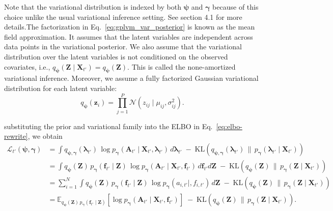 Note that the variational distribution is indexed by both 
\(\boldsymbol{\psi}\) and \(\boldsymbol{\gamma}\) because of this choice unlike the usual 
variational inference setting. See section 4.1 \cite{leibfriedTutorialSparseGaussian2022} for more details.The factorization in Eq.~\ref{eq:gplvm_var_posterior} is known as 
the mean field approximation. It assumes that the 
latent variables are independent across data points in the variational posterior. We also assume that 
the variational distribution over the latent variables is not conditioned on the observed covariates, i.e.,
\(q_{\boldsymbol{\psi}}(\mathbf{Z}\mid \mathbf{X}_{t'}) = q_{\boldsymbol{\psi}}(\mathbf{Z})\). This is called 
the none-amortized variational inference. Moreover, we assume 
a fully factorized Gaussian variational distribution for each latent variable:
\begin{equation}
    q_{\boldsymbol{\psi}}(\mathbf{z}_i) = \prod_{j=1}^P \mathcal{N}(z_{ij} \mid \mu_{ij}, \sigma_{ij}^2).
\end{equation}

substituting the prior and variational family into the ELBO in Eq.~\ref{eq:elbo-rewrite}, we obtain
\begin{align}
\mathcal{L}_{t'}(\boldsymbol{\psi},\boldsymbol{\gamma})
&= \int q_{\boldsymbol{\psi},\boldsymbol{\gamma}}(\boldsymbol{\lambda}_{t'})\,\log p_{\boldsymbol{\gamma}}(\mathbf{A}_{t'}\mid \mathbf{X}_{t'},\boldsymbol{\lambda}_{t'})\, d\boldsymbol{\lambda}_{t'}
    \;-\; \mathrm{KL}\!\left(q_{\boldsymbol{\psi},\boldsymbol{\gamma}}(\boldsymbol{\lambda}_{t'})\,\|\,p_{\boldsymbol{\gamma}}(\boldsymbol{\lambda}_{t'}\mid \mathbf{X}_{t'})\right) \\
&= \int q_{\boldsymbol{\psi}}(\mathbf{Z})\,p_{\boldsymbol{\gamma}}(\mathbf{f}_{t'} \mid \mathbf{Z})\,\log p_{\boldsymbol{\gamma}}(\mathbf{A}_{t'}\mid \mathbf{X}_{t'},\mathbf{f}_{t'})\, d\mathbf{f}_{t'} d\mathbf{Z}
    \;-\; \mathrm{KL}\!\left(q_{\boldsymbol{\psi}}(\mathbf{Z})\,\|\,p_{\boldsymbol{\gamma}}(\mathbf{Z}\mid \mathbf{X}_{t'})\right) \\
&= \sum_{i=1}^N \int q_{\boldsymbol{\psi}}(\mathbf{Z})\,p_{\boldsymbol{\gamma}}(\mathbf{f}_{t'} \mid \mathbf{Z})\,\log p_{\boldsymbol{\gamma}}(a_{i,t'}\mid,f_{i,t'})\,d\mathbf{Z}
    \;-\; \mathrm{KL}\!\left(q_{\boldsymbol{\psi}}(\mathbf{Z})\,\|\,p_{\boldsymbol{\gamma}}(\mathbf{Z}\mid \mathbf{X}_{t'})\right) \\
&= \mathbb{E}_{q_{\boldsymbol{\psi}}(\mathbf{Z})\,p_{\boldsymbol{\gamma}}(\mathbf{f}_{t'} \mid \mathbf{Z})}
\left[\log p_{\boldsymbol{\gamma}}(\mathbf{A}_{t'}\mid \mathbf{X}_{t'},\mathbf{f}_{t'})\right]
    \;-\; \mathrm{KL}\!\left(q_{\boldsymbol{\psi}}(\mathbf{Z})\,\|\,p_{\boldsymbol{\gamma}}(\mathbf{Z}\mid \mathbf{X}_{t'})\right).
\label{eq:gplvm_elbo}
\end{align}

